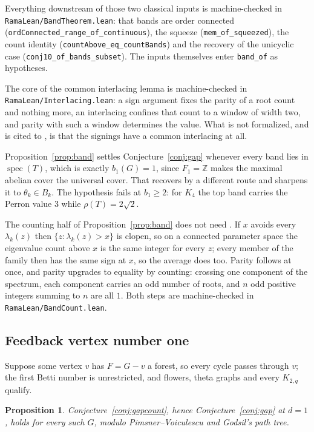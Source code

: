 \documentclass[11pt]{article}
\newtheorem{proposition}[theorem]{Proposition}
\theoremstyle{remark}
\begin{document}
Everything downstream of those two classical inputs is machine-checked in
\texttt{RamaLean/BandTheorem.lean}: that bands are order connected
(\texttt{ordConnected\_range\_of\_continuous}), the squeeze
(\texttt{mem\_of\_squeezed}), the count identity (\texttt{countAbove\_eq\_countBands}) and
the recovery of the unicyclic case (\texttt{conj10\_of\_bands\_subset}). The inputs
themselves enter \texttt{band\_of} as hypotheses.

The core of the common interlacing lemma is machine-checked in
\texttt{RamaLean/Interlacing.lean}: a sign argument fixes the parity of a root count and
nothing more, an interlacing confines that count to a window of width two, and parity with
such a window determines the value. What is not formalized, and is cited to \cite{MSS}, is
that the signings have a common interlacing at all.

Proposition~\ref{prop:band} settles Conjecture~\ref{conj:gap} whenever every band lies in
$\operatorname{spec}(T)$, which is exactly $b_1(G)=1$, since $F_1=\mathbb{Z}$ makes the maximal
abelian cover the universal cover. That recovers \cite{PartI} by a different route
and sharpens it to $\theta_k\in B_k$. The hypothesis fails at $b_1\ge2$: for $K_4$ the top
band carries the Perron value $3$ while $\rho(T)=2\sqrt2$.

The counting half of Proposition~\ref{prop:band} does not need \cite{MSS}. If $x$ avoids
every $\lambda_k(z)$ then $\{z:\lambda_k(z)>x\}$ is clopen, so on a connected parameter space
the eigenvalue count above $x$ is the same integer for every $z$; every member of the family
then has the same sign at $x$, so the average does too. Parity follows at once, and parity
upgrades to equality by counting: crossing one component of the spectrum, each component
carries an odd number of roots, and $n$ odd positive integers summing to $n$ are all $1$.
Both steps are machine-checked in \texttt{RamaLean/BandCount.lean}.

\subsection{Feedback vertex number one}

Suppose some vertex $v$ has $F=G-v$ a forest, so every cycle passes through $v$; the first
Betti number is unrestricted, and flowers, theta graphs and every $K_{2,q}$ qualify.

\begin{proposition}\label{prop:fvs1}
Conjecture~\ref{conj:gapcount}, hence Conjecture~\ref{conj:gap} at $d=1$, holds for every
such $G$, modulo Pimsner--Voiculescu and Godsil's path tree.
\end{proposition}
\end{document}
